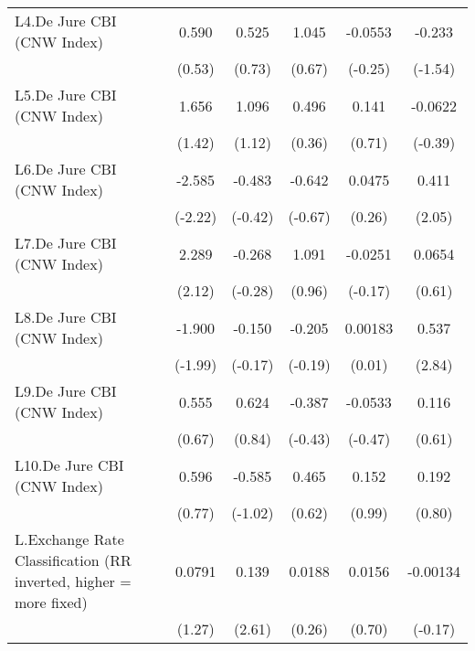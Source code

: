 {\begin{tabular*}{\linewidth}{@{\hskip\tabcolsep\extracolsep\fill}l*{5}{c}}
\addlinespace
L4.De Jure CBI (CNW Index)&    0.590         &    0.525         &    1.045         &  -0.0553         &   -0.233         \\
                &   (0.53)         &   (0.73)         &   (0.67)         &  (-0.25)         &  (-1.54)         \\
\addlinespace
L5.De Jure CBI (CNW Index)&    1.656         &    1.096         &    0.496         &    0.141         &  -0.0622         \\
                &   (1.42)         &   (1.12)         &   (0.36)         &   (0.71)         &  (-0.39)         \\
\addlinespace
L6.De Jure CBI (CNW Index)&   -2.585\sym{*}  &   -0.483         &   -0.642         &   0.0475         &    0.411\sym{*}  \\
                &  (-2.22)         &  (-0.42)         &  (-0.67)         &   (0.26)         &   (2.05)         \\
\addlinespace
L7.De Jure CBI (CNW Index)&    2.289\sym{*}  &   -0.268         &    1.091         &  -0.0251         &   0.0654         \\
                &   (2.12)         &  (-0.28)         &   (0.96)         &  (-0.17)         &   (0.61)         \\
\addlinespace
L8.De Jure CBI (CNW Index)&   -1.900\sym{*}  &   -0.150         &   -0.205         &  0.00183         &    0.537\sym{**} \\
                &  (-1.99)         &  (-0.17)         &  (-0.19)         &   (0.01)         &   (2.84)         \\
\addlinespace
L9.De Jure CBI (CNW Index)&    0.555         &    0.624         &   -0.387         &  -0.0533         &    0.116         \\
                &   (0.67)         &   (0.84)         &  (-0.43)         &  (-0.47)         &   (0.61)         \\
\addlinespace
L10.De Jure CBI (CNW Index)&    0.596         &   -0.585         &    0.465         &    0.152         &    0.192         \\
                &   (0.77)         &  (-1.02)         &   (0.62)         &   (0.99)         &   (0.80)         \\
\addlinespace
L.Exchange Rate Classification (RR inverted, higher = more fixed)&   0.0791         &    0.139\sym{*}  &   0.0188         &   0.0156         & -0.00134         \\
                &   (1.27)         &   (2.61)         &   (0.26)         &   (0.70)         &  (-0.17)         \\

\end{tabular*}}
